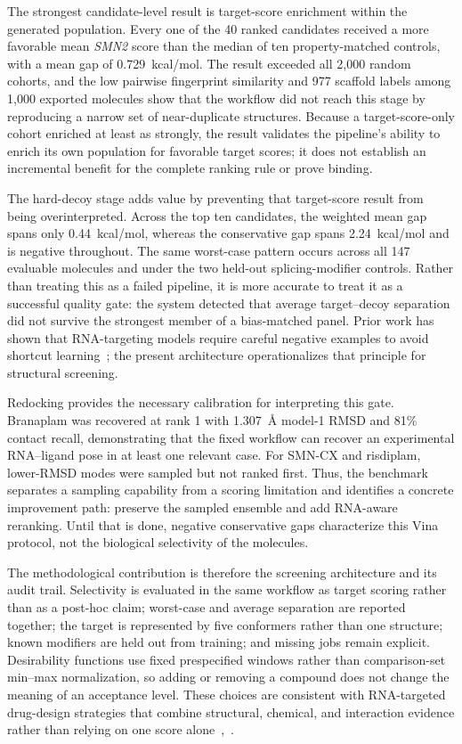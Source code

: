 \documentclass[journal]{IEEEtran}
\begin{document}
The strongest candidate-level result is target-score enrichment within
the generated population. Every one of the 40 ranked candidates received
a more favorable mean \textit{SMN2} score than the median of ten
property-matched controls, with a mean gap of 0.729~kcal/mol. The result
exceeded all 2{,}000 random cohorts, and the low pairwise fingerprint
similarity and 977 scaffold labels among 1{,}000 exported molecules show
that the workflow did not reach this stage by reproducing a narrow set
of near-duplicate structures. Because a target-score-only cohort
enriched at least as strongly, the result validates the pipeline's
ability to enrich its own population for favorable target scores; it
does not establish an incremental benefit for the complete ranking rule
or prove binding.

The hard-decoy stage adds value by preventing that target-score result
from being overinterpreted. Across the top ten candidates, the weighted
mean gap spans only 0.44~kcal/mol, whereas the conservative gap spans
2.24~kcal/mol and is negative throughout. The same worst-case pattern
occurs across all 147 evaluable molecules and under the two held-out
splicing-modifier controls. Rather than treating this as a failed
pipeline, it is more accurate to treat it as a successful quality gate:
the system detected that average target--decoy separation did not survive
the strongest member of a bias-matched panel. Prior work has shown that
RNA-targeting models require careful negative examples to avoid shortcut
learning~\cite{wen2026}; the present architecture operationalizes that
principle for structural screening.

Redocking provides the necessary calibration for interpreting this
gate. Branaplam was recovered at rank 1 with 1.307~\AA{} model-1 RMSD
and 81\% contact recall, demonstrating that the fixed workflow can
recover an experimental RNA--ligand pose in at least one relevant case.
For SMN-CX and risdiplam, lower-RMSD modes were sampled but not ranked
first. Thus, the benchmark separates a sampling capability from a
scoring limitation and identifies a concrete improvement path: preserve
the sampled ensemble and add RNA-aware reranking. Until that is done,
negative conservative gaps characterize this Vina protocol, not the
biological selectivity of the molecules.

The methodological contribution is therefore the screening
architecture and its audit trail. Selectivity is evaluated in the same
workflow as target scoring rather than as a post-hoc claim; worst-case
and average separation are reported together; the target is represented
by five conformers rather than one structure; known modifiers are held
out from training; and missing jobs remain explicit. Desirability
functions use fixed prespecified windows rather than comparison-set
min--max normalization, so adding or removing a compound does not change
the meaning of an acceptance level. These choices are consistent with
RNA-targeted drug-design strategies that combine structural, chemical,
and interaction evidence rather than relying on one score
alone~\cite{haga2023},~\cite{zhou2024}.
\end{document}
